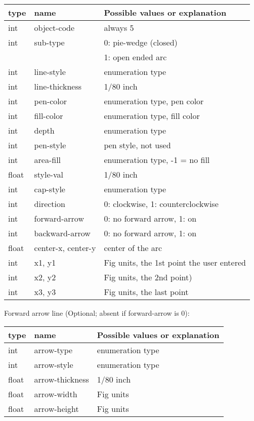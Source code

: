 \documentclass[10pt, a4paper]{article}
\begin{document}
\begin{tabular}{|lll|}
\hline
type & name & Possible values or explanation \\
\hline
\hline
int    & object-code            & always 5 \\
int    & sub-type               & 0: pie-wedge (closed) \\
&&                                1: open ended arc \\
int    & line-style             & enumeration type \\
int    & line-thickness         & 1/80 inch \\
int    & pen-color              & enumeration type, pen color \\
int    & fill-color             & enumeration type, fill color \\
int    & depth                  & enumeration type \\
int    & pen-style              & pen style, not used \\
int    & area-fill              & enumeration type, -1 = no fill \\
float  & style-val              & 1/80 inch \\
int    & cap-style              & enumeration type \\
int    & direction              & 0: clockwise, 1: counterclockwise \\
int    & forward-arrow          & 0: no forward arrow, 1: on \\
int    & backward-arrow         & 0: no forward arrow, 1: on \\
float  & center-x, center-y     & center of the arc \\
int    & x1, y1                 & Fig units, the 1st point the user entered \\
int    & x2, y2                 & Fig units, the 2nd point) \\
int    & x3, y3                 & Fig units, the last point \\
\hline
\end{tabular}

    Forward arrow line (Optional; absent if forward-arrow is 0):

\begin{tabular}{|lll|}
\hline
type & name & Possible values or explanation \\
\hline
\hline
int    & arrow-type              & enumeration type \\
int    & arrow-style             & enumeration type \\
float  & arrow-thickness         & 1/80 inch \\
float  & arrow-width             & Fig units \\
float  & arrow-height            & Fig units \\
\hline
\end{tabular}
\end{document}
